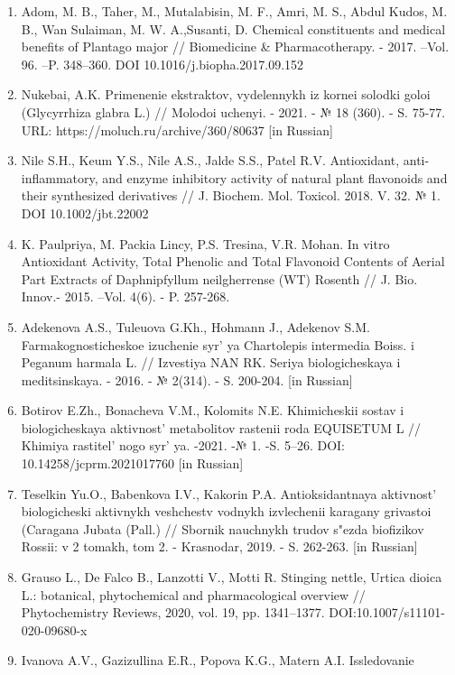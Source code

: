 \begin{enumerate}
\def\labelenumi{\arabic{enumi}.}
\item
  Adom, M. B., Taher, M., Mutalabisin, M. F., Amri, M. S., Abdul Kudos,
  M. B., Wan Sulaiman, M. W. A.,Susanti, D. Chemical constituents and
  medical benefits of Plantago major // Biomedicine \& Pharmacotherapy.
  - 2017. --Vol. 96. --P. 348--360. DOI 10.1016/j.biopha.2017.09.152
\item
  Nukebai, A.K. Primenenie ekstraktov, vydelennykh iz kornei solodki
  goloi (Glycyrrhiza glabra L.) // Molodoi uchenyi. - 2021. - № 18
  (360). - S. 75-77. URL: https://moluch.ru/archive/360/80637 {[}in
  Russian{]}
\item
  Nile S.H., Keum Y.S., Nile A.S., Jalde S.S., Patel R.V. Antioxidant,
  anti-inflammatory, and enzyme inhibitory activity of natural plant
  flavonoids and their synthesized derivatives // J. Biochem. Mol.
  Toxicol. 2018. V. 32. № 1. DOI 10.1002/jbt.22002
\item
  K. Paulpriya, M. Packia Lincy, P.S. Tresina, V.R. Mohan. In vitro
  Antioxidant Activity, Total Phenolic and Total Flavonoid Contents of
  Aerial Part Extracts of Daphnipfyllum neilgherrense (WT) Rosenth // J.
  Bio. Innov.- 2015. --Vol. 4(6). - P. 257-268.
\item
  Adekenova A.S., Tuleuova G.Kh., Hohmann J., Adekenov S.M.
  Farmakognosticheskoe izuchenie syr' ya Chartolepis
  intermedia Boiss. i Peganum harmala L. // Izvestiya NAN RK. Seriya
  biologicheskaya i meditsinskaya. - 2016. - № 2(314). - S. 200-204.
  {[}in Russian{]}
\item
  Botirov E.Zh., Bonacheva V.M., Kolomits N.E. Khimicheskii sostav i
  biologicheskaya aktivnost'{} metabolitov rastenii roda
  EQUISETUM L // Khimiya rastitel' nogo
  syr' ya. -2021. -№ 1. -S. 5--26. DOI:
  10.14258/jcprm.2021017760 {[}in Russian{]}
\item
  Teselkin Yu.O., Babenkova I.V., Kakorin P.A. Antioksidantnaya
  aktivnost'{} biologicheski aktivnykh veshchestv vodnykh
  izvlechenii karagany grivastoi (Caragana Jubata (Pall.) // Sbornik
  nauchnykh trudov s"ezda biofizikov Rossii: v 2 tomakh, tom 2. -
  Krasnodar, 2019. - S. 262-263. {[}in Russian{]}
\item
  Grauso L., De Falco B., Lanzotti V., Motti R. Stinging nettle, Urtica
  dioica L.: botanical, phytochemical and pharmacological overview //
  Phytochemistry Reviews, 2020, vol. 19, pp. 1341--1377.
  DOI:10.1007/s11101-020-09680-x
\item
  Ivanova A.V., Gazizullina E.R., Popova K.G., Matern A.I. Issledovanie

\end{enumerate}
